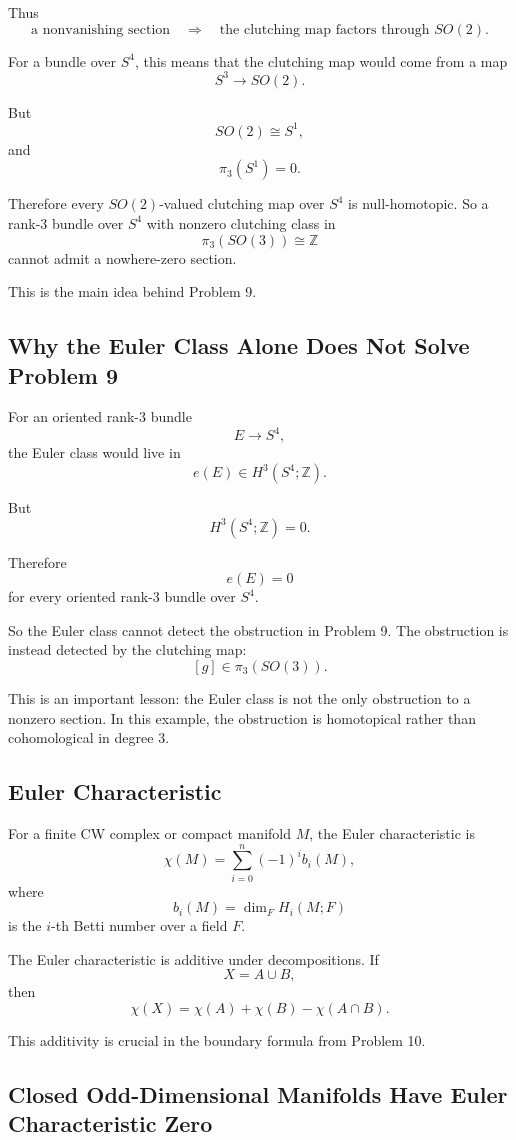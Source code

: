 \documentclass[12pt,a4paper]{article}
\theoremstyle{notespace}
\begin{document}
Thus
\[
\text{a nonvanishing section}
\quad\Longrightarrow\quad
\text{the clutching map factors through }SO(2).
\]

For a bundle over \(S^4\), this means that the clutching map would come from a
map
\[
S^3\to SO(2).
\]

But
\[
SO(2)\cong S^1,
\]
and
\[
\pi_3(S^1)=0.
\]

Therefore every \(SO(2)\)-valued clutching map over \(S^4\) is null-homotopic.
So a rank-\(3\) bundle over \(S^4\) with nonzero clutching class in
\[
\pi_3(SO(3))\cong \mathbb Z
\]
cannot admit a nowhere-zero section.

This is the main idea behind Problem 9.

\subsection{Why the Euler Class Alone Does Not Solve Problem 9}

For an oriented rank-\(3\) bundle
\[
E\to S^4,
\]
the Euler class would live in
\[
e(E)\in H^3(S^4;\mathbb Z).
\]

But
\[
H^3(S^4;\mathbb Z)=0.
\]

Therefore
\[
e(E)=0
\]
for every oriented rank-\(3\) bundle over \(S^4\).

So the Euler class cannot detect the obstruction in Problem 9. The obstruction
is instead detected by the clutching map:
\[
[g]\in \pi_3(SO(3)).
\]

This is an important lesson: the Euler class is not the only obstruction to a
nonzero section. In this example, the obstruction is homotopical rather than
cohomological in degree \(3\).

\subsection{Euler Characteristic}

For a finite CW complex or compact manifold \(M\), the Euler characteristic is
\[
\chi(M)=\sum_{i=0}^{n}(-1)^i b_i(M),
\]
where
\[
b_i(M)=\dim_F H_i(M;F)
\]
is the \(i\)-th Betti number over a field \(F\).

The Euler characteristic is additive under decompositions. If
\[
X=A\cup B,
\]
then
\[
\chi(X)=\chi(A)+\chi(B)-\chi(A\cap B).
\]

This additivity is crucial in the boundary formula from Problem 10.

\subsection{Closed Odd-Dimensional Manifolds Have Euler Characteristic Zero}
\end{document}
